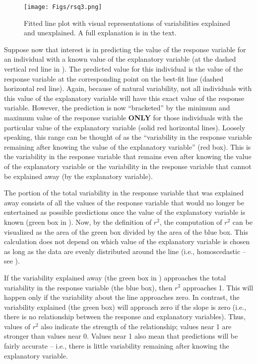\documentclass[10pt,openany]{book}\usepackage[]{graphicx}\usepackage[]{color}
\begin{document}
\begin{figure}[htbp]
  \centering
    \texttt{[image: Figs/rsq3.png]}
  \caption{Fitted line plot with visual representations of variabilities explained and unexplained.  A full explanation is in the text.}
  \label{fig:CoeffDeterm}
\end{figure}

Suppose now that interest is in predicting the value of the response variable for an individual with a known value of the explanatory variable (at the dashed vertical red line in ).  The predicted value for this individual is the value of the response variable at the corresponding point on the best-fit line (dashed horizontal red line).  Again, because of natural variability, not all individuals with this value of the explanatory variable will have this exact value of the response variable.  However, the prediction is now ``bracketed'' by the minimum and maximum value of the response variable \textbf{ONLY} for those individuals with the particular value of the explanatory variable (solid red horizontal lines).  Loosely speaking, this range can be thought of as the ``variability in the response variable remaining after knowing the value of the explanatory variable'' (red box).  This is the variability in the response variable that remains even after knowing the value of the explanatory variable or the variability in the response variable that cannot be explained away (by the explanatory variable).

The portion of the total variability in the response variable that was explained away consists of all the values of the response variable that would no longer be entertained as possible predictions once the value of the explanatory variable is known (green box in ).  Now, by the definition of $r^{2}$, the computation of $r^{2}$ can be visualized as the area of the green box divided by the area of the blue box.  This calculation does not depend on which value of the explanatory variable is chosen as long as the data are evenly distributed around the line (i.e., homoscedastic -- see ).

If the variability explained away (the green box in ) approaches the total variability in the response variable (the blue box), then $r^{2}$ approaches 1.  This will happen only if the variability about the line approaches zero.  In contrast, the variability explained (the green box) will approach zero if the slope is zero (i.e., there is no relationship between the response and explanatory variables).  Thus, values of $r^{2}$ also indicate the strength of the relationship; values near 1 are stronger than values near 0.  Values near 1 also mean that predictions will be fairly accurate -- i.e., there is little variability remaining after knowing the explanatory variable.
\end{document}
